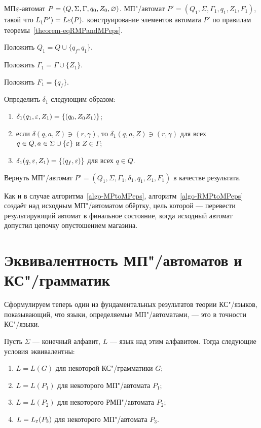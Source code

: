 {\label{algo-RMPtoMPeps} МП$\varepsilon$-автомат $P = (Q, \Sigma, \Gamma, q_0, Z_0, \varnothing)$. }
{МП"/автомат $P' = (Q_1, \Sigma, \Gamma_1, q_1, Z_1, F_1)$, такой что $L_(P') = L\varepsilon(P).$}
{ конструирование элементов автомата $P'$ по правилам теоремы~\ref{theorem-eqRMPandMPeps}.}
{
\item Положить $Q_1 = Q \cup \{ q_f, q_1 \}$.

\item Положить $\Gamma_1 = \Gamma \cup \{Z_1\}$.

\item Положить $F_1 = \{q_f\}$.

\item Определить $\delta_1$ следующим образом:
	\begin{enumerate}[itemindent=\parindent,leftmargin=!]
		\item $\delta_1(q_1, \varepsilon, Z_1) = \{ (q_0, Z_0Z_1) \}$;
		\item если $\delta(q, a, Z) \ni (r, \gamma)$, то $\delta_1(q, a, Z) \ni (r, \gamma)$ для всех $q \in Q, a \in \Sigma \cup \{ \varepsilon \}$ и $Z \in \Gamma$;
		\item $\delta_1(q, \varepsilon, Z_1) = \{ (q_f, \varepsilon) \}$ для всех $q \in Q$.
  \end{enumerate}  

\item Вернуть МП"/автомат $P' = (Q_1, \Sigma, \Gamma_1, \delta_1, q_1, Z_1, F_1)$ в качестве результата.
} 

Как и в случае алгоритма~\ref{algo-MPtoMPeps}, алгоритм~\ref{algo-RMPtoMPeps}  создаёт над исходным МП"/автоматом обёртку, цель которой --- перевести результирующий автомат в финальное состояние, когда исходный автомат допустил цепочку опустошением магазина. 

\section {Эквивалентность МП"/автоматов и КС"/грамматик}
\label{Chapter8GrammarEqFSM}

Сформулируем теперь один из фундаментальных результатов теории КС"/языков, показывающий, что языки, определяемые МП"/автоматами, --- это в точности КС"/языки.

\begin{mytheorem}
\label{theorem-eqKSandMP}
Пусть $\Sigma$ --- конечный алфавит, $L$ --- язык над этим алфавитом. Тогда следующие условия эквивалентны:
\begin{enumerate}
\item $L=L(G)$ для некоторой КС"/грамматики $G$;
\item $L=L(P_1)$ для некоторого МП"/автомата $P_1$;
\item $L=L(P_2)$ для некоторого РМП"/автомата $P_2$;
\item $L=L_\varepsilon(P_3)$ для некоторого МП"/автомата $P_3$.
\end{enumerate}
\end{mytheorem}


